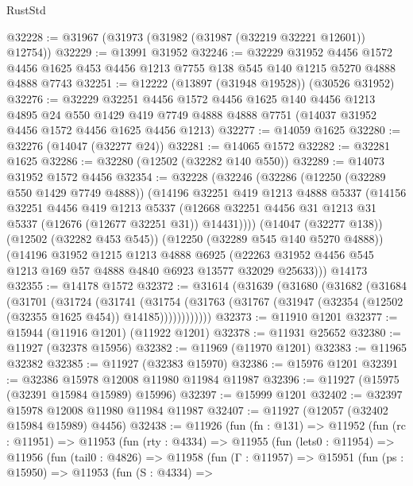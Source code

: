 \begin{lexlean}{RustStd}
\begin{coremodule}
@32228 := @31967 (@31973 (@31982 (@31987 (@32219 @32221 @12601)) @12754))
@32229 := @13991 @31952
@32246 := @32229
    @31952
    @4456
    @1572
    @4456
    @1625
    @453
    @4456
    @1213
    @7755
    @138
    @545
    @140
    @1215
    @5270
    @4888
    @4888
    @7743
@32251 := @12222 (@13897 (@31948 @19528)) (@30526 @31952)
@32276 := @32229
    @32251
    @4456
    @1572
    @4456
    @1625
    @140
    @4456
    @1213
    @4895
    @24
    @550
    @1429
    @419
    @7749
    @4888
    @4888
    @7751
    (@14037 @31952 @4456 @1572 @4456 @1625 @4456 @1213)
@32277 := @14059 @1625
@32280 := @32276 (@14047 (@32277 @24))
@32281 := @14065 @1572
@32282 := @32281 @1625
@32286 := @32280 (@12502 (@32282 @140 @550))
@32289 := @14073 @31952 @1572 @4456
@32354 := @32228
    (@32246
      (@32286
        (@12250 (@32289 @550 @1429 @7749 @4888))
        (@14196
          @32251
          @419
          @1213
          @4888
          @5337
          (@14156
            @32251
            @4456
            @419
            @1213
            @5337
            (@12668 @32251 @4456 @31 @1213 @31 @5337 (@12676 (@12677 @32251 @31)) @14431))))
      (@14047 (@32277 @138))
      (@12502 (@32282 @453 @545))
      (@12250 (@32289 @545 @140 @5270 @4888))
      (@14196
        @31952
        @1215
        @1213
        @4888
        @6925
        (@22263 @31952 @4456 @545 @1213 @169 @57 @4888 @4840 @6923 @13577 @32029 @25633)))
    @14173
@32355 := @14178 @1572
@32372 := @31614
    (@31639
      (@31680
        (@31682
          (@31684
            (@31701
              (@31724
                (@31741
                  (@31754
                    (@31763 (@31767 (@31947 (@32354 (@12502 (@32355 @1625 @454)) @14185))))))))))))
@32373 := @11910 @1201
@32377 := @15944 (@11916 @1201) (@11922 @1201)
@32378 := @11931 @25652
@32380 := @11927 (@32378 @15956)
@32382 := @11969 (@11970 @1201)
@32383 := @11965 @32382
@32385 := @11927 (@32383 @15970)
@32386 := @15976 @1201
@32391 := @32386 @15978 @12008 @11980 @11984 @11987
@32396 := @11927 (@15975 (@32391 @15984 @15989) @15996)
@32397 := @15999 @1201
@32402 := @32397 @15978 @12008 @11980 @11984 @11987
@32407 := @11927 (@12057 (@32402 @15984 @15989) @4456)
@32438 := @11926
    (fun (fn : @131) =>
    @11952
      (fun (rc : @11951) =>
      @11953
        (fun (rty : @4334) =>
        @11955
          (fun (lets0 : @11954) =>
          @11956
            (fun (tail0 : @4826) =>
            @11958
              (fun (Γ : @11957) =>
              @15951
                (fun (ps : @15950) =>
                @11953
                  (fun (S : @4334) =>

\end{coremodule}
\end{lexlean}

